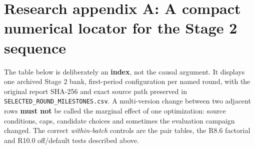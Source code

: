 \section{Research appendix A: A compact numerical locator for the Stage 2 sequence}\label{appendix-a.-a-compact-numerical-locator-for-the-stage-2-sequence}

The table below is deliberately an \textbf{index}, not the causal argument. It displays one archived Stage 2 bank, first-period configuration per named round, with the original report SHA-256 and exact source path preserved in \texttt{SELECTED\_ROUND\_MILESTONES.csv}. A multi-version change between two adjacent rows \textbf{must not} be called the marginal effect of one optimization: source conditions, caps, candidate choices and sometimes the evaluation campaign changed. The correct \emph{within-batch} controls are the pair tables, the R8.6 factorial and R10.0 off/default tests described above.

